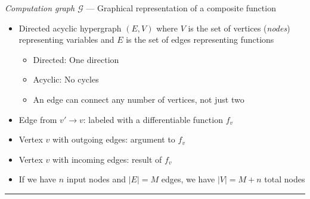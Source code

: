 \emph{Computation graph $\mathcal{G}$} --- Graphical representation of a composite function
\begin{itemize}
    \item Directed acyclic hypergraph $(E, V)$ where $V$ is the set of vertices (\emph{nodes}) representing variables and $E$ is the set of edges representing functions
    \begin{itemize}
        \item Directed: One direction
        \item Acyclic: No cycles
        \item An edge can connect any number of vertices, not just two
    \end{itemize}
    \item Edge from $v' \to v$: labeled with a differentiable function $f_v$
    \item Vertex $v$ with outgoing edges: argument to $f_v$
    \item Vertex $v$ with incoming edges: result of $f_v$
    \item If we have $n$ input nodes and $|E| = M$ edges, we have $|V| = M + n$ total nodes
\end{itemize}

{\color{lightgray}\hrule height 0.001mm}

